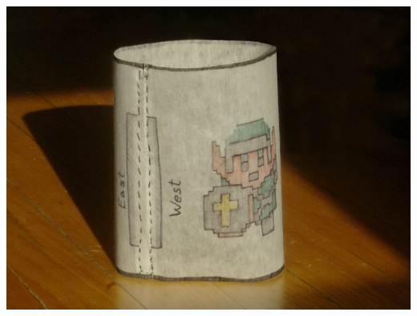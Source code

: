 \documentclass[compress]{beamer}
\begin{document}
\begin{frame}
\begin{columns}
\includegraphics[width=\linewidth]{pictures/circular_dungeon.jpg}
\end{columns}
\end{frame}
\end{document}
